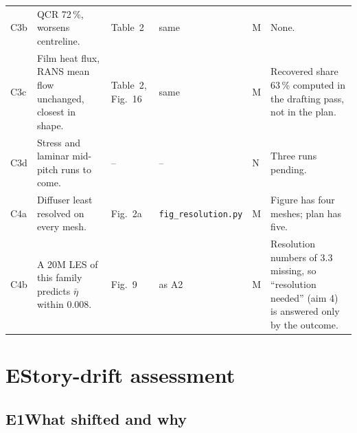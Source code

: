\documentclass[10pt]{article}
\begin{document}
{\begin{longtable}{@{}L{0.5cm} L{4.9cm} L{2.0cm} L{4.0cm} L{0.5cm} L{4.4cm}@{}}
C3b & QCR 72\,\%, worsens centreline. & Table~2 & same & M & None. \\
C3c & Film heat flux, RANS mean flow unchanged, closest in shape. & Table~2, Fig.~16 & same & M & Recovered share
63\,\% computed in the drafting pass, not in the plan. \\
C3d & Stress and laminar mid-pitch runs to come. & -- & -- & N & Three runs pending. \\
C4a & Diffuser least resolved on every mesh. & Fig.~2a & \texttt{fig\_resolution.py} & M & Figure has four
meshes; plan has five. \\
C4b & A 20M LES of this family predicts $\bar\eta$ within 0.008. & Fig.~9 & as A2 & M & Resolution numbers of
3.3 missing, so ``resolution needed'' (aim 4) is answered only by the outcome. \\
\bottomrule
\end{longtable}}

\newpage
\section*{E\quad Story-drift assessment}

\subsection*{E1\quad What shifted and why}
\end{document}
